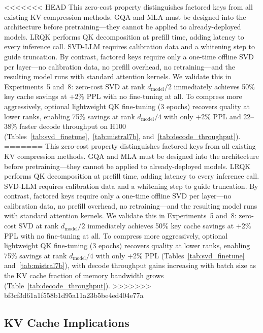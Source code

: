 \documentclass[11pt]{article}
\newcommand{\dmodel}{d_{\text{model}}}
\begin{document}
<<<<<<< HEAD
This zero-cost property distinguishes factored keys from all existing KV compression methods. GQA \citep{ainslie2023gqa} and MLA \citep{liu2024deepseek} must be designed into the architecture before pretraining---they cannot be applied to already-deployed models. LRQK \citep{lrqk2025} performs QK decomposition at prefill time, adding latency to every inference call. SVD-LLM \citep{svdllm2025} requires calibration data and a whitening step to guide truncation. By contrast, factored keys require only a one-time offline SVD per layer---no calibration data, no prefill overhead, no retraining---and the resulting model runs with standard attention kernels. We validate this in Experiments~5 and~8: zero-cost SVD at rank $\dmodel/2$ immediately achieves 50\% key cache savings at +2\% PPL with no fine-tuning at all. To compress more aggressively, optional lightweight QK fine-tuning (3 epochs) recovers quality at lower ranks, enabling 75\% savings at rank $\dmodel/4$ with only +2\% PPL and 22--38\% faster decode throughput on H100 (Tables~\ref{tab:svd_finetune},~\ref{tab:mistral7b}, and~\ref{tab:decode_throughput}).
=======
This zero-cost property distinguishes factored keys from all existing KV compression methods. GQA \citep{ainslie2023gqa} and MLA \citep{liu2024deepseek} must be designed into the architecture before pretraining---they cannot be applied to already-deployed models. LRQK \citep{lrqk2025} performs QK decomposition at prefill time, adding latency to every inference call. SVD-LLM \citep{svdllm2025} requires calibration data and a whitening step to guide truncation. By contrast, factored keys require only a one-time offline SVD per layer---no calibration data, no prefill overhead, no retraining---and the resulting model runs with standard attention kernels. We validate this in Experiments~5 and~8: zero-cost SVD at rank $\dmodel/2$ immediately achieves 50\% key cache savings at +2\% PPL with no fine-tuning at all. To compress more aggressively, optional lightweight QK fine-tuning (3 epochs) recovers quality at lower ranks, enabling 75\% savings at rank $\dmodel/4$ with only +2\% PPL (Tables~\ref{tab:svd_finetune} and~\ref{tab:mistral7b}), with decode throughput gains increasing with batch size as the KV cache fraction of memory bandwidth grows (Table~\ref{tab:decode_throughput}).
>>>>>>> bf3cf3d61a1f558b1d95a11a23b5be4ed404e77a


\subsection{KV Cache Implications}
\end{document}
